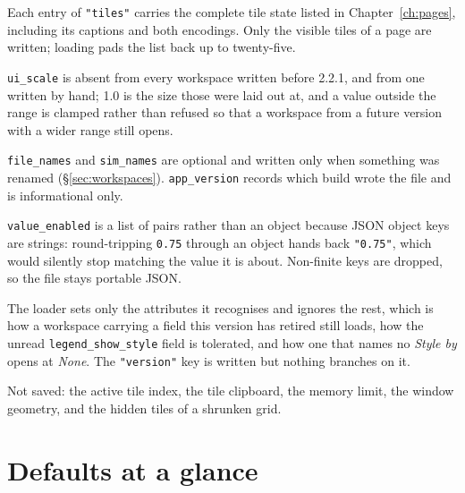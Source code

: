 \documentclass[11pt,a4paper,oneside]{report}
\newcommand{\appver}{2.2.1}
\newcommand{\code}[1]{\texttt{#1}}
\begin{document}
Each entry of \code{"tiles"} carries the complete tile state listed in
Chapter~\ref{ch:pages}, including its captions and both encodings. Only the
visible tiles of a page are written; loading pads the list back up to
twenty-five.

\code{ui\_scale} is absent from every workspace written before \appver{}, and
from one written by hand; 1.0 is the size those were laid out at, and a value
outside the range is clamped rather than refused so that a workspace from a
future version with a wider range still opens.

\code{file\_names} and \code{sim\_names} are optional and written only when
something was renamed (\S\ref{sec:workspaces}). \code{app\_version} records
which build wrote the file and is informational only.

\code{value\_enabled} is a list of pairs rather than an object because JSON
object keys are strings: round-tripping \code{0.75} through an object hands back
\code{"0.75"}, which would silently stop matching the value it is about.
Non-finite keys are dropped, so the file stays portable JSON.

The loader sets only the attributes it recognises and ignores the rest, which is
how a workspace carrying a field this version has retired still loads, how the
unread \code{legend\_show\_style} field is tolerated, and how one that names no
\emph{Style by} opens at \emph{None}. The \code{"version"} key is written but nothing
branches on it.

Not saved: the active tile index, the tile clipboard, the memory limit, the
window geometry, and the hidden tiles of a shrunken grid.

\chapter{Defaults at a glance}
\end{document}
